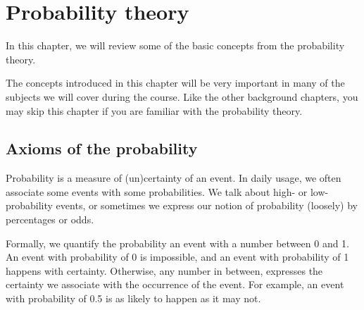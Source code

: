 \chapter{\label{chap:prob}Probability theory}

%
%




In this chapter,
we will review some of the basic concepts from the probability theory.

The concepts introduced in this chapter will be
very important in many of the subjects
we will cover during the course.
Like the other background chapters,
you may skip this chapter if you are familiar with the probability theory.

\section{Axioms of the probability}

Probability is a measure of (un)certainty of an event.
In daily usage,
we often associate some events with some probabilities.
We talk about high- or low-probability events,
or sometimes we express our notion of probability
(loosely) by percentages or odds.

Formally,
we quantify the probability an event
with a number between \num{0} and \num{1}.
An event with probability of \num{0} is impossible,
and an event with probability of \num{1} happens with certainty.
Otherwise, any number in between,
expresses the certainty we associate with the occurrence of the event.
For example,
an event with probability of \num{0.5} is as likely to happen as it may not.

